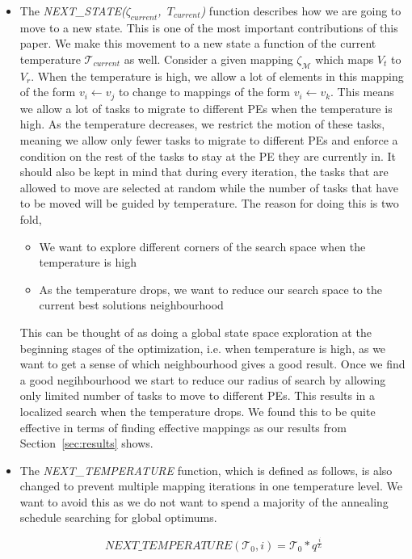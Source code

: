 \begin{itemize}
\item The \mbox{\textit{NEXT\_STATE($\zeta_{current}$, $T_{current}$)}} function
describes how we are going to move to a new state. This is one of the most
important contributions of this paper. We make this movement to a new state a
function of the current temperature $\mathcal{T}_{current}$ as well. Consider a
given mapping $\zeta_\mathcal{M}$ which maps $V_t$ to $V_r$. When the
temperature is high, we allow a lot of elements in this mapping of the form $v_i
\leftarrow v_j$ to change to mappings of the form $v_i \leftarrow v_k$. This
means we allow a lot of tasks to migrate to different PEs when the temperature
is high. As the temperature decreases, we restrict the motion of these tasks,
meaning we allow only fewer tasks to migrate to different PEs and enforce a
condition on the rest of the tasks to stay at the PE they are currently in. It
should also be kept in mind that during every iteration, the tasks that are
allowed to move are selected at random while the number of tasks that have to be
moved will be guided by temperature. The reason for doing this is two fold,
\begin{itemize}
\item We want to explore different corners of the search space when the
temperature is high
\item As the temperature drops, we want to reduce our search space to the
current best solutions neighbourhood
\end{itemize}
This can be thought of as doing a global state space exploration at the
beginning stages of the optimization, i.e. when temperature is high, as
we want to get a sense of which neighbourhood gives a good result. Once
we find a good negihbourhood we start to reduce our radius of search by
allowing only limited number of tasks to move to different PEs. This
results in a localized search when the temperature drops. We found this
to be quite effective in terms of finding effective mappings as our
results from Section~\ref{sec:results} shows.

\item The \textit{NEXT\_TEMPERATURE} function, which is defined as follows, is
also changed to prevent multiple mapping iterations in one temperature level. We
want to avoid this as we do not want to spend a majority of the annealing
schedule searching for global optimums. 

\begin{equation}
  \textit{NEXT\_TEMPERATURE}(\mathcal{T}_0, i) =
  \mathcal{T}_0*q^{\frac{i}{L}}
\end{equation}


\end{itemize}
